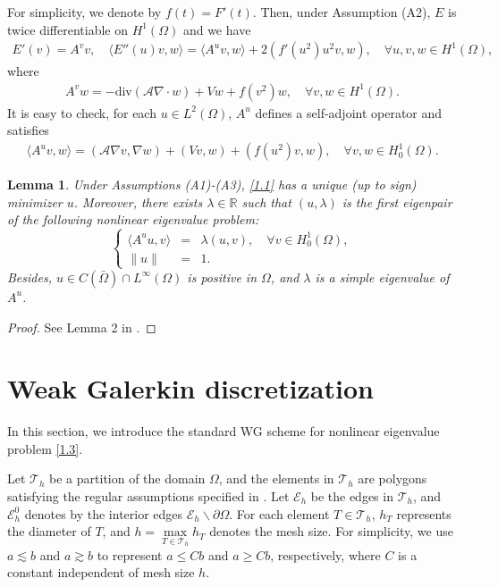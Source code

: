 \documentclass[compress, preprint,9pt]{elsarticle}
\numberwithin{equation}{section}
\newtheorem{lemma}{Lemma}[section]
\newcommand{\E}{\mathcal{E}}
\newcommand{\T}{{\mathcal{T}}}
\newcommand{\di}{\text{div}}
\newcommand{\A}{\mathcal{A}}
\newcommand{\Real}{\mathbb{R}}
\newcommand{\la}{\langle}
\newcommand{\ran}{\rangle}
\begin{document}
For simplicity, we denote by $f(t)=F'(t)$. Then, under Assumption (A2), $E$ is twice differentiable on $H^1(\Omega)$ and we have
\begin{eqnarray*}
	E'(v)=A^vv,\quad \la E''(u)v,w\ran=\la A^uv,w\ran+2(f'(u^2)u^2v,w),\quad\forall u,v,w\in H^1(\Omega),
\end{eqnarray*}
where
\begin{eqnarray*}
	A^vw=-\di(\A\nabla\cdot w)+Vw+f(v^2)w,\quad\forall v,w\in H^1(\Omega).
\end{eqnarray*}
It is easy to check, for each $u\in L^2(\Omega)$, $A^u$ defines a self-adjoint operator and satisfies
\begin{eqnarray*}
	\la A^uv,w\ran=(\A\nabla v,\nabla w)+(Vv,w)+(f(u^2)v,w),\quad\forall v,w\in H_0^1(\Omega).
\end{eqnarray*}

\begin{lemma}\label{lem1}
	Under Assumptions (A1)-(A3), \eqref{1.1} has a unique (up to sign) minimizer $u$. Moreover, there exists $\lambda\in\Real$ such that $(u,\lambda)$ is the first eigenpair of the following nonlinear eigenvalue problem:
	\begin{equation}\label{1.3}
		\left\{\begin{array}{rcl}
			\la A^uu,v\ran&=&\lambda (u,v),\quad\forall v\in H_0^1(\Omega),\\
			\|u\| &=&1.
		\end{array}\right.
	\end{equation}
	Besides, $u\in C(\bar{\Omega})\cap L^\infty(\Omega)$ is positive in $\Omega$, and $\lambda$ is a simple eigenvalue of $A^u$.
\end{lemma}
\begin{proof}
	See Lemma 2 in \cite{Eric2009}.
\end{proof}

\section{Weak Galerkin discretization}In this section, we introduce the standard WG scheme for nonlinear eigenvalue problem \eqref{1.3}.


Let $\T_h$ be a partition of the domain $\Omega$, and the elements
in $\T_h$ are polygons satisfying the regular assumptions specified
in \cite{Wang2014a}. Let $\E_h$ be the edges in $\T_h$, and
$\E_h^0$ denotes by the interior edges $\E_h \backslash\partial\Omega$. For each element $T\in\T_h$, $h_T$ represents the diameter of $T$, and $h=\max\limits_{T\in\T_h} h_T$ denotes the mesh size. For simplicity, we use $a\lesssim b$  and $a\gtrsim b$ to represent $a\le Cb$ and $a\ge Cb$, respectively, where $C$ is a constant independent of mesh size $h$.
\end{document}
